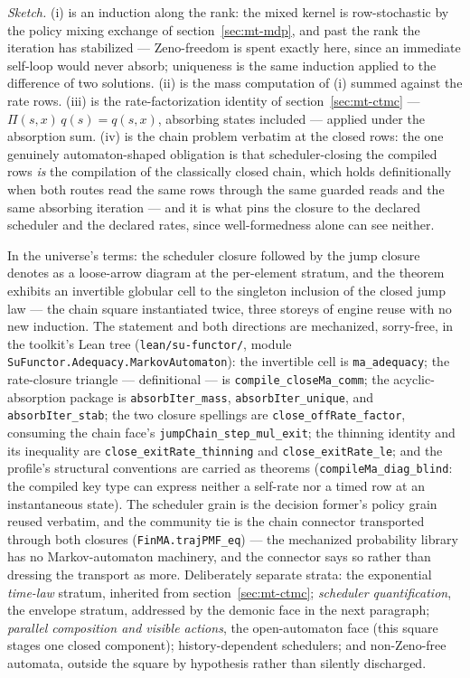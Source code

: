 \emph{Sketch.}  (i) is an induction along the rank: the mixed kernel
is row-stochastic by the policy mixing exchange of
section~\ref{sec:mt-mdp}, and past the rank the iteration has
stabilized --- Zeno-freedom is spent exactly here, since an immediate
self-loop would never absorb; uniqueness is the same induction applied
to the difference of two solutions.  (ii) is the mass computation of
(i) summed against the rate rows.  (iii) is the rate-factorization
identity of section~\ref{sec:mt-ctmc} --- $\Pi(s, x)\, q(s) = q(s, x)$,
absorbing states included --- applied under the absorption sum.  (iv)
is the chain problem verbatim at the closed rows: the one genuinely
automaton-shaped obligation is that scheduler-closing the compiled
rows \emph{is} the compilation of the classically closed chain, which
holds definitionally when both routes read the same rows through the
same guarded reads and the same absorbing iteration --- and it is what
pins the closure to the declared scheduler and the declared rates,
since well-formedness alone can see neither.

In the universe's terms: the scheduler closure followed by the jump
closure denotes as a loose-arrow diagram at the per-element stratum,
and the theorem exhibits an invertible globular cell to the singleton
inclusion of the closed jump law --- the chain square instantiated
twice, three storeys of engine reuse with no new induction.  The
statement and both directions are mechanized, sorry-free, in the
toolkit's Lean tree (\texttt{lean/su-functor/}, module
\texttt{SuFunctor.Adequacy.MarkovAutomaton}): the invertible cell is
\texttt{ma\_adequacy}; the rate-closure triangle --- definitional ---
is \texttt{compile\_closeMa\_comm}; the acyclic-absorption package is
\texttt{absorbIter\_mass}, \texttt{absorbIter\_unique}, and
\texttt{absorbIter\_stab}; the two closure spellings are
\texttt{close\_offRate\_factor}, consuming the chain face's
\texttt{jumpChain\_step\_mul\_exit}; the thinning identity and its
inequality are \texttt{close\_exitRate\_thinning} and
\texttt{close\_exitRate\_le}; and the profile's structural
conventions are carried as theorems (\texttt{compileMa\_diag\_blind}:
the compiled key type can express neither a self-rate nor a timed row
at an instantaneous state).  The scheduler grain is the decision
former's policy grain reused verbatim, and the community tie is the
chain connector transported through both closures
(\texttt{FinMA.trajPMF\_eq}) --- the mechanized probability library
has no Markov-automaton machinery, and the connector says so rather
than dressing the transport as more.  Deliberately separate strata:
the exponential \emph{time-law} stratum, inherited from
section~\ref{sec:mt-ctmc}; \emph{scheduler quantification}, the
envelope stratum, addressed by the demonic face in the next paragraph;
\emph{parallel composition and visible actions}, the open-automaton
face (this square stages one closed component); history-dependent
schedulers; and non-Zeno-free automata, outside the square by
hypothesis rather than silently discharged.

